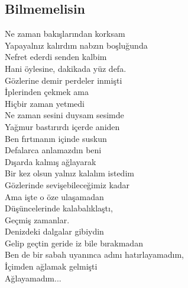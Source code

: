 \subsection{Bilmemelisin}

Ne zaman bakışlarından korksam \\
Yapayalnız kalırdım nabzın boşluğunda \\
Nefret ederdi senden kalbim \\
Hani öylesine, dakikada yüz defa. \\
Gözlerine demir perdeler inmişti \\
İplerinden çekmek ama \\
Hiçbir zaman yetmedi \\

\noindent\newline
Ne zaman sesini duysam sesimde \\
Yağmur bastırırdı içerde aniden \\
Ben fırtınanın içinde suskun \\
Defalarca anlamazdın beni \\
Dışarda kalmış ağlayarak \\

\noindent\newline
Bir kez olsun yalnız kalalım istedim \\
Gözlerinde sevişebileceğimiz kadar \\
Ama işte o öze ulaşamadan \\
Düşüncelerinde kalabalıklaştı, \\
Geçmiş zamanlar. \\

\noindent\newline
Denizdeki dalgalar gibiydin \\
Gelip geçtin geride iz bile bırakmadan \\
Ben de bir sabah uyanınca adını hatırlayamadım, \\
İçimden ağlamak gelmişti \\
Ağlayamadım... \\